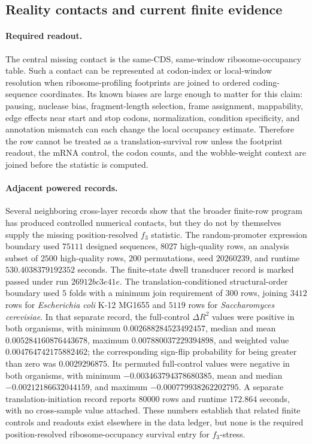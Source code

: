 \subsection{Reality contacts and current finite evidence}\label{sec:q6-f3-stress-position-resolved-translation-survival-evidence}

\paragraph{Required readout.} The central missing contact is the same-CDS, same-window ribosome-occupancy table.  Such a contact can be represented at codon-index or local-window resolution when ribosome-profiling footprints are joined to ordered coding-sequence coordinates.  Its known biases are large enough to matter for this claim: pausing, nuclease bias, fragment-length selection, frame assignment, mappability, edge effects near start and stop codons, normalization, condition specificity, and annotation mismatch can each change the local occupancy estimate.  Therefore the row cannot be treated as a translation-survival row unless the footprint readout, the mRNA control, the codon counts, and the wobble-weight context are joined before the statistic is computed.

\paragraph{Adjacent powered records.} Several neighboring cross-layer records show that the broader finite-row program has produced controlled numerical contacts, but they do not by themselves supply the missing position-resolved $f_3$ statistic.  The random-promoter expression boundary used $75111$ designed sequences, $8027$ high-quality rows, an analysis subset of $2500$ high-quality rows, $200$ permutations, seed $20260239$, and runtime $530.4038379192352$ seconds.  The finite-state dwell transducer record is marked passed under run $26912bc3e41e$.  The translation-conditioned structural-order boundary used $5$ folds with a minimum join requirement of $300$ rows, joining $3412$ rows for \emph{Escherichia coli} K-12 MG1655 and $5119$ rows for \emph{Saccharomyces cerevisiae}.  In that separate record, the full-control $\Delta R^2$ values were positive in both organisms, with minimum $0.002688284523492457$, median and mean $0.005284160876443678$, maximum $0.007880037229394898$, and weighted value $0.004764742175882462$; the corresponding sign-flip probability for being greater than zero was $0.0029296875$.  Its permuted full-control values were negative in both organisms, with minimum $-0.003463794378680385$, mean and median $-0.00212186632044159$, and maximum $-0.000779938262202795$.  A separate translation-initiation record reports $80000$ rows and runtime $172.864$ seconds, with no cross-sample value attached.  These numbers establish that related finite controls and readouts exist elsewhere in the data ledger, but none is the required position-resolved ribosome-occupancy survival entry for $f_3$-stress.

